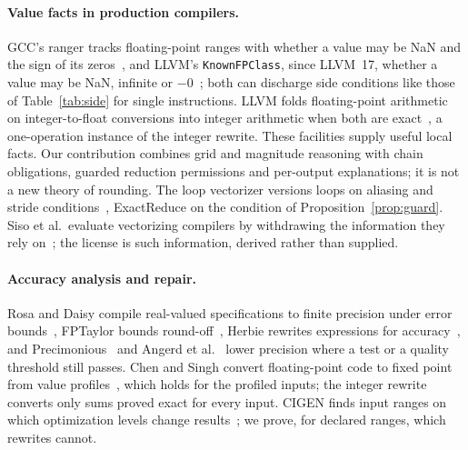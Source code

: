 \documentclass[acmsmall,review,anonymous,nonacm]{acmart}
\begin{document}
\paragraph{Value facts in production compilers.} GCC's ranger tracks
floating-point ranges with whether a value may be NaN and the sign of its
zeros~\cite{gcc-frange}, and LLVM's \texttt{KnownFPClass}, since LLVM~17,
whether a value may be NaN, infinite or $-0$~\cite{llvm-kfpc}; both can
discharge side conditions like those of Table~\ref{tab:side} for single
instructions. LLVM folds floating-point arithmetic on integer-to-float
conversions into integer arithmetic when both are exact~\cite{llvm-intcast}, a
one-operation instance of the integer rewrite. These facilities supply useful local facts. Our contribution combines
grid and magnitude reasoning with chain obligations, guarded reduction
permissions and per-output explanations; it is not a new theory of rounding. The loop
vectorizer versions loops on aliasing and stride
conditions~\cite{llvm-vectorizers}, ExactReduce on the condition of
Proposition~\ref{prop:guard}. Siso et al.\ evaluate vectorizing compilers by
withdrawing the information they rely on~\cite{siso}; the license is such
information, derived rather than supplied.

\paragraph{Accuracy analysis and repair.} Rosa and Daisy compile real-valued
specifications to finite precision under error bounds~\cite{rosa,daisy}, FPTaylor
bounds round-off~\cite{fptaylor}, Herbie rewrites expressions for
accuracy~\cite{herbie}, and Precimonious~\cite{precimonious} and Angerd et
al.~\cite{angerd} lower precision where a test or a quality threshold still
passes. Chen and Singh convert floating-point code to fixed point from value
profiles~\cite{chen-fixed}, which holds for the profiled inputs; the integer
rewrite converts only sums proved exact for every input. CIGEN finds input
ranges on which optimization levels change results~\cite{cigen}; we prove, for
declared ranges, which rewrites cannot.
\end{document}
